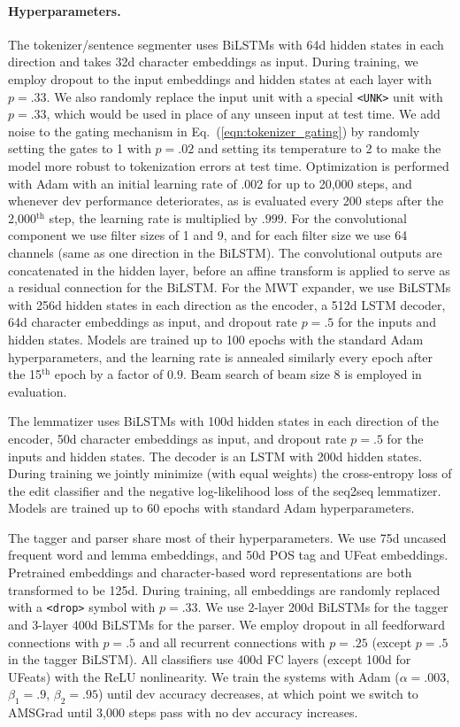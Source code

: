 \documentclass[11pt,a4paper]{article}
\begin{document}
\paragraph{Hyperparameters.} The tokenizer\slash sentence segmenter uses BiLSTMs with 64d hidden states in each direction and takes 32d character embeddings as input.
During training, we employ dropout to the input embeddings and hidden states at each layer with $p=.33$.
We also randomly replace the input unit with a special \texttt{<UNK>} unit with $p=.33$, which would be used in place of any unseen input at test time.
We add noise to the gating mechanism in Eq.\ (\ref{eqn:tokenizer_gating}) by randomly setting the gates to 1 with $p=.02$ and setting its temperature to 2 to make the model more robust to tokenization errors at test time.
Optimization is performed with Adam \cite{kingma2015adam} with an initial learning rate of .002 for up to 20,000 steps, and whenever dev performance deteriorates, as is evaluated every 200 steps after the 2,000$^{\text{th}}$ step, the learning rate is multiplied by $.999$.
For the convolutional component we use filter sizes of 1 and 9, and for each filter size we use 64 channels (same as one direction in the BiLSTM).
The convolutional outputs are concatenated in the hidden layer, before an affine transform is applied to serve as a residual connection for the BiLSTM.
For the MWT expander, we use BiLSTMs with 256d hidden states in each direction as the encoder, a 512d LSTM decoder, 64d character embeddings as input, and dropout rate $p=.5$ for the inputs and hidden states.
Models are trained up to 100 epochs with the standard Adam hyperparameters, and the learning rate is annealed  similarly every epoch after the 15$^{\text{th}}$ epoch  by a factor of $0.9$.
Beam search of beam size 8 is employed in evaluation.

The lemmatizer uses BiLSTMs with 100d hidden states in each direction of the encoder, 50d character embeddings as input, and dropout rate $p=.5$ for the inputs and hidden states.
The decoder is an LSTM with 200d hidden states.
During training we jointly minimize (with equal weights) the cross-entropy loss of the edit classifier and the negative log-likelihood loss of the seq2seq lemmatizer.
Models are trained up to 60 epochs with standard Adam hyperparameters.

The tagger and parser share most of their hyperparameters.
We use 75d uncased frequent word and lemma embeddings, and 50d POS tag and UFeat embeddings.
Pretrained embeddings and character-based word representations are both transformed to be 125d.
During training, all embeddings are randomly replaced with a \texttt{<drop>} symbol with $p=.33$.
We use 2-layer 200d BiLSTMs for the tagger and 3-layer 400d BiLSTMs for the parser.
We employ dropout in all feedforward connections with $p=.5$ and all recurrent connections \citep{gal2016dropout} with $p=.25$ (except $p=.5$ in the tagger BiLSTM).
All classifiers use 400d FC layers (except 100d for UFeats) with the ReLU nonlinearity.
We train the systems with Adam ($\alpha=.003$, $\beta_1=.9$, $\beta_2=.95$) until dev accuracy decreases, at which point we switch to AMSGrad \citep{reddi2018convergence} until 3,000 steps pass with no dev accuracy increases.
 
\end{document}
